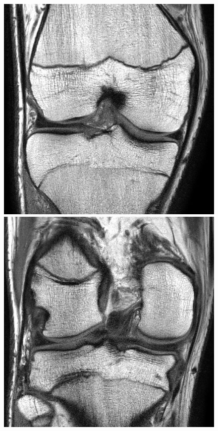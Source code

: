 \begin{figure}[H]
\endminipage\hfill
{}%
  \includegraphics[width=\linewidth]{imgs/17.jpg}
\endminipage
\vspace{0.2cm}
  \includegraphics[width=\linewidth]{imgs/24.jpg}

\end{figure}

